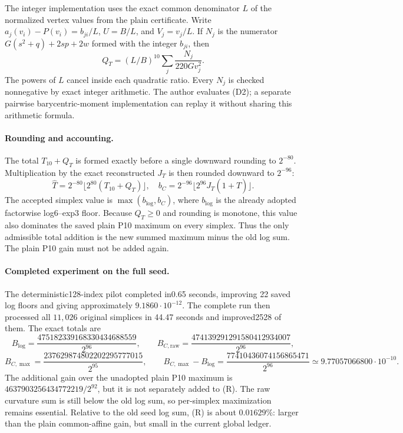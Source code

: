 The integer implementation uses the exact common denominator $L$ of
the normalized vertex values from the plain certificate. Write
$a_j(v_i)-P(v_i)=b_{ji}/L$, $U=B/L$, and
$V_j=v_j/L$. If $N_j$ is the numerator
$G(s^2+q)+2sp+2w$ formed with the integer $b_{ji}$, then
\[
 Q_T=(L/B)^{10}\sum_j\frac{N_j}{220Gv_j^2}.
\]
The powers of $L$ cancel inside each quadratic ratio. Every $N_j$ is
checked nonnegative by exact integer arithmetic. The author evaluates
(D2); a separate pairwise barycentric-moment implementation can replay
it without sharing this arithmetic formula.

\paragraph{Rounding and accounting.}
The total $T_{10}+Q_T$ is formed exactly before a single downward
rounding to $2^{-80}$. Multiplication by the exact reconstructed
$J_T$ is then rounded downward to $2^{-96}$:
\[
 \widehat T=2^{-80}\lfloor2^{80}(T_{10}+Q_T)\rfloor,
 \quad
 b_C=2^{-96}\lfloor2^{96}J_T(1+\widehat T)\rfloor.
\]
The accepted simplex value is $\max(b_{\log},b_C)$, where $b_{\log}$
is the already adopted factorwise log6--exp3 floor. Because $Q_T\ge0$
and rounding is monotone, this value also dominates the saved plain
P10 maximum on every simplex. Thus the only admissible total addition
is the new summed maximum minus the old log sum. The plain P10 gain
must not be added again.

\paragraph{Completed experiment on the full seed.}
The deterministic128-index pilot completed in0.65 seconds, improving
22 saved log floors and giving approximately $9.1860\cdot10^{-12}$.
The complete run then processed all $11{,}026$ original simplices in
44.47 seconds and improved2528 of them. The exact totals are
\[
 B_{\log}=\frac{475182339168330434688559}{2^{96}},\qquad
 B_{C,\mathrm{raw}}=\frac{474139291291580412934007}{2^{96}},
\]
\[
 B_{C,\max}=\frac{237629874802202295777015}{2^{95}},\qquad
 B_{C,\max}-B_{\log}
 =\frac{77410436074156865471}{2^{96}}
 \simeq9.77057066800\cdot10^{-10}.
 \tag{R}
\]
The additional gain over the unadopted plain P10 maximum is
$4637903256434772219/2^{92}$, but it is not separately added to (R).
The raw curvature sum is still below the old log sum, so per-simplex
maximization remains essential. Relative to the old seed log sum,
(R) is about $0.01629\%$: larger than the plain common-affine gain,
but small in the current global ledger.

